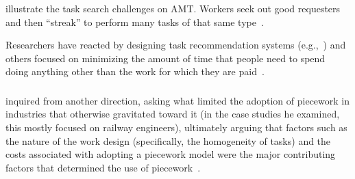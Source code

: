 \documentclass[trackingWork]{subfiles}
\begin{document}


\citeauthor{taskSearch} illustrate the task search challenges on AMT.%
Workers seek out good requesters~\cite{martin2014being} and then  ``streak'' to perform many tasks of that same type~\cite{taskSearch}.

Researchers have reacted by designing task recommendation systems (e.g.,~\cite{Cosley:2007:SUI:1216295.1216309})
and others focused on minimizing the amount of time that people need to spend doing anything other than the work for which they are paid~\cite{callison2014crowd}.



\subsubsection{\pieceworkpers}
\citeauthor{Brown01041990} inquired from another direction, asking
what limited the adoption of piecework in industries that otherwise gravitated toward it
(in the case studies he examined, this mostly focused on railway engineers),
ultimately arguing that factors such as the nature of the work design
(specifically, the homogeneity of tasks) and the costs associated with adopting a piecework model
were the major contributing factors that determined the use of piecework~\cite{Brown01041990}.
\end{document}
